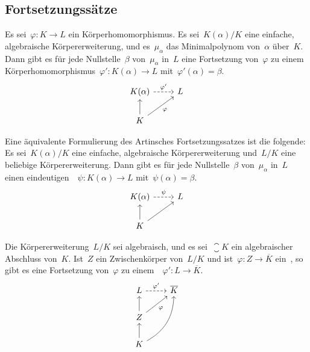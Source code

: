 \subsection{Fortsetzungssätze}

\begin{theorem}
  Es sei~$\varphi \colon K \to L$ ein Körperhomomorphismus.
  Es sei~$K(\alpha)/K$ eine einfache, algebraische Körpererweiterung, und es~$\mu_\alpha$ das Minimalpolynom von~$\alpha$ über~$K$.
  Dann gibt es für jede Nullstelle~$\beta$ von~$\mu_\alpha$ in~$L$ eine Fortsetzung von~$\varphi$ zu einem Körperhomomorphismus~$\varphi' \colon K(\alpha) \to L$ mit~$\varphi'(\alpha) = \beta$.
  \[
    \begin{tikzcd}
      K(\alpha)
      \arrow[dashed]{r}[above]{\varphi'}
      &
      L
      \\
      K
      \arrow{u}
      \arrow{ur}[below right]{\varphi}
      &
      {}
    \end{tikzcd}
  \]
\end{theorem}

\begin{remark}
  Eine äquivalente Formulierung des Artinsches Fortsetzungssatzes ist die folgende:
  Es sei~$K(\alpha)/K$ eine einfache, algebraische Körpererweiterung und~$L/K$ eine beliebige Körpererweiterung.
  Dann gibt es für jede Nullstelle~$\beta$ von~$\mu_\alpha$ in~$L$ einen eindeutigen~~$\psi \colon K(\alpha) \to L$ mit~$\psi(\alpha) = \beta$.
  \[
    \begin{tikzcd}
      K(\alpha)
      \arrow[dashed]{r}[above]{\psi}
      &
      L
      \\
      K
      \arrow{u}
      \arrow{ur}
      &
      {}
    \end{tikzcd}
  \]
\end{remark}

\begin{theorem}
  Die Körpererweiterung~$L/K$ sei algebraisch, und es sei~$\closure{K}$ ein algebraischer Abschluss von~$K$.
  Ist~$Z$ ein Zwischenkörper von~$L/K$ und ist~$\varphi \colon Z \to \overline{K}$ ein~, so gibt es eine Fortsetzung von~$\varphi$ zu einem~~$\varphi' \colon L \to \overline{K}$.
  \[
    \begin{tikzcd}
      L
      \arrow[dashed]{r}[above]{\varphi'}
      &
      \closure{K}
      \\
      Z
      \arrow{u}
      \arrow{ur}[below right]{\varphi}
      &
      {}
      \\
      K
      \arrow{u}
      \arrow[bend right]{uur}
      &
      {}
    \end{tikzcd}
  \]
\end{theorem}

